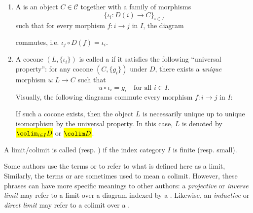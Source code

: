 \begin{definition}
\begin{enumerate}
    
    \item A  is an object $C \in \mathcal{C}$ together with a family of morphisms
    \[
    \{\iota_i: D(i) \to C\}_{i \in I}
    \]
    such that for every morphism $f: i \to j$ in $I$, the diagram
    \begin{center}
    \end{center}
    commutes, i.e. $\iota_j \circ D(f) = \iota_i$.

    \item A cocone $(L, \{\iota_i\})$ is called a  if it satisfies the following ``universal property'':
    for any cocone $(C, \{ g_i \})$ under $D$, there exists a \textit{unique} morphism $u: L \to C$ such that
    \[
    u \circ \iota_i = g_i \quad \text{for all } i \in I.
    \]
    Visually, the following diagrams commute every morphism $f: i \to j$ in $I$:
    \begin{center}
    \end{center}
    If such a cocone exists, then the object $L$ is necessarily unique up to unique isomorphism by the universal property. In this case, $L$ is denoted by \hl{$\colim_{i \in I} D$} or \hl{$\colim D$}.

\end{enumerate}

A limit/colimit is called  (resp. ) if the index category $I$ is finite (resp. small).

Some authors use the terms  or  to refer to what is defined here as a limit, Similarly, the terms  or  are sometimes used to mean a colimit. However, these phrases can have more specific meanings to other authors: a \emph{projective} or \emph{inverse limit} may refer to a limit over a diagram indexed by a . Likewise, an \emph{inductive} or \emph{direct limit} may refer to a colimit over a .


\end{definition}
